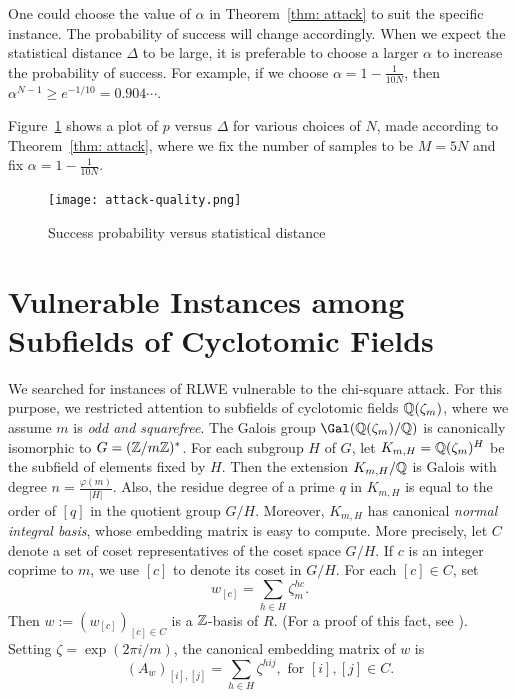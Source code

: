 \documentclass[envcountsect]{llncs}
\begin{document}
\begin{remark}
One could choose the value of $\alpha$ in Theorem~\ref{thm: attack} to suit the specific instance.
The probability of success will change accordingly. When we expect the statistical distance $\Delta$ to be large, it is preferable to choose a larger $\alpha$ to increase the probability of success.  For example, if we choose $\alpha = 1-\frac{1}{10N}$, then $\alpha^{N-1} \geq e^{-1/10} = 0.904 \cdots$. 
\end{remark}

Figure~\ref{fig: probability} shows a plot of $p$ versus $\Delta$ for various choices of $N$, made according to Theorem~\ref{thm: attack}, where we fix the number of samples to be $M = 5N$ and fix $\alpha = 1-\frac{1}{10N}$.
\begin{figure}
\begin{center}
\texttt{[image: attack-quality.png]}
\caption{Success probability versus statistical distance}
\label{fig: probability}
\end{center}
\end{figure}
\section{Vulnerable Instances among Subfields of Cyclotomic Fields}\label{sec: sub-cyclotomics}
We searched for instances of RLWE vulnerable to the chi-square attack.  For this purpose, we restricted attention to subfields of cyclotomic fields $\mathbb{Q}(\zeta_m)$, where we assume $m$ is {\it odd and squarefree}. The Galois group $\Gal(\bQ(\zeta_m)/\bQ)$ is canonically isomorphic to $G = (\mathbb{Z}/m\mathbb{Z})^*$. For each subgroup $H$ of $G$, let $K_{m,H} = \mathbb{Q}(\zeta_m)^H$ be the subfield of elements fixed by $H$.
Then the extension $K_{m,H}/\mathbb{Q}$ is Galois with degree $n = \frac{\varphi(m)}{|H|}$. Also, the residue degree of a prime $q$ in $K_{m,H}$ is equal to the order of $[q]$ in the quotient group $G/H$. Moreover, $K_{m,H}$ has canonical {\it normal integral basis}, whose embedding matrix is easy to compute. More precisely, let $C$ denote a set of coset representatives of the coset space $G/H$. If $c$ is an integer coprime to $m$, we use $[c]$ to denote its coset in $G/H$. For each $[c] \in C$, set
\[
    w_{[c]} =  \sum_{h \in H} \zeta_m^{hc}.
\]
Then  $w := (w_{[c]})_{[c] \in C}$ is a $\mathbb{Z}$-basis of $R$. (For a proof of this fact, see \cite[Proposition 6.1]{johnston2011notes}). Setting $\zeta = \exp(2\pi i /m)$, the canonical  embedding matrix of $w$ is
\[
    (A_w)_{[i],[j]} = \sum_{h \in H}{\zeta^{hij}}, \mbox{ for } [i], [j] \in C.
\]
\end{document}
